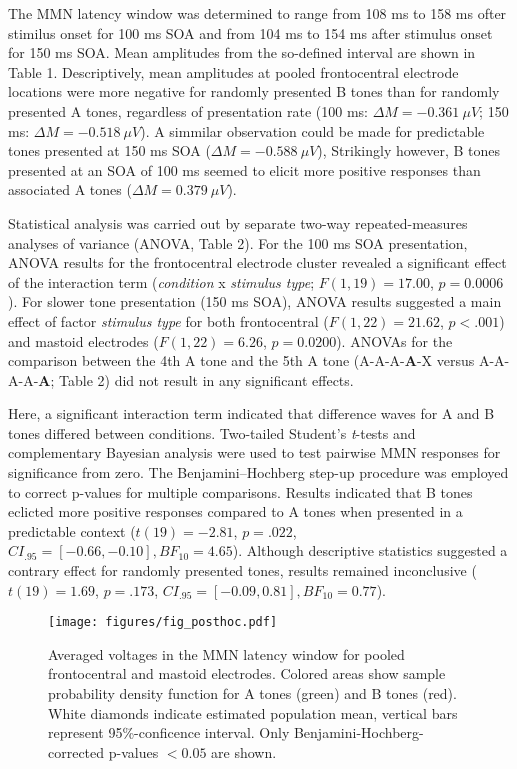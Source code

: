 \documentclass[twoside, man, a4paper,12pt, nofontenc]{apa7}
\begin{document}
The MMN latency window was determined to range from 108 ms to 158 ms
ofter stimilus onset for 100 ms SOA and from 104 ms to 154 ms after
stimulus onset for 150 ms SOA. Mean amplitudes from the so-defined
interval are shown in Table 1. Descriptively, mean amplitudes at pooled
frontocentral electrode locations were more negative for randomly
presented B tones than for randomly presented A tones, regardless of
presentation rate (100 ms: \(\Delta M = -0.361 \: \mu V\); 150 ms:
\(\Delta M = -0.518 \: \mu V\)). A simmilar observation could be made
for predictable tones presented at 150 ms SOA
(\(\Delta M = -0.588 \: \mu V\)), Strikingly however, B tones presented
at an SOA of 100 ms seemed to elicit more positive responses than
associated A tones (\(\Delta M = 0.379 \: \mu V\)).

Statistical analysis was carried out by separate two-way
repeated-measures analyses of variance (ANOVA, Table 2). For the 100 ms
SOA presentation, ANOVA results for the frontocentral electrode cluster
revealed a significant effect of the interaction term (\emph{condition}
x \emph{stimulus type}; \(F(1,19) = 17.00\), \(p = 0.0006\)). For slower
tone presentation (150 ms SOA), ANOVA results suggested a main effect of
factor \emph{stimulus type} for both frontocentral (\(F(1,22) = 21.62\),
\(p < .001\)) and mastoid electrodes (\(F(1,22) = 6.26\),
\(p = 0.0200\)). ANOVAs for the comparison between the 4th A tone and
the 5th A tone (A-A-A-\textbf{A}-X versus A-A-A-A-\textbf{A}; Table 2)
did not result in any significant effects.



Here, a significant interaction term indicated that difference waves for
A and B tones differed between conditions. Two-tailed Student's
\emph{t}-tests and complementary Bayesian analysis were used to test
pairwise MMN responses for significance from zero. The
Benjamini--Hochberg step-up procedure was employed to correct p-values
for multiple comparisons. Results indicated that B tones eclicted more
positive responses compared to A tones when presented in a predictable
context (\(t(19) = -2.81\), \(p = .022\),
\(CI_{.95} = [-0.66,-0.10], BF_{10} = 4.65\)). Although descriptive
statistics suggested a contrary effect for randomly presented tones,
results remained inconclusive (\(t(19) = 1.69\), \(p = .173\),
\(CI_{.95} = [-0.09,0.81], BF_{10} = 0.77\)).

\begin{figure}
\centering
\texttt{[image: figures/fig\_posthoc.pdf]}
\caption{Averaged voltages in the MMN latency window for pooled
frontocentral and mastoid electrodes. Colored areas show sample
probability density function for A tones (green) and B tones (red).
White diamonds indicate estimated population mean, vertical bars
represent 95\%-conficence interval. Only Benjamini-Hochberg-corrected
p-values \(< 0.05\) are shown.}
\end{figure}
\end{document}
